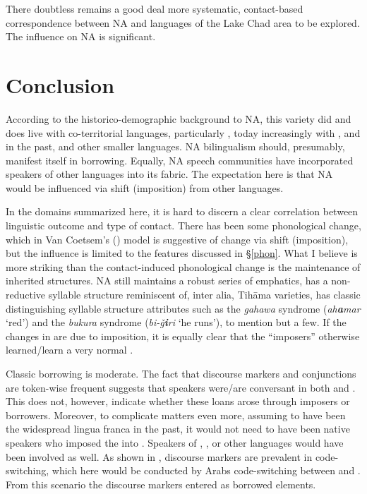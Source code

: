 \documentclass[output=paper]{langsci/langscibook}
\begin{document}
There doubtless remains a good deal more systematic, contact-based correspondence between NA and languages of the {Lake Chad} area to be explored. The influence on NA is significant.

\section{Conclusion
} \label{conc}

According to the historico-demographic background to NA, this variety did and does live with co-territorial languages, particularly , today increasingly with , and in the past,  and other smaller languages. NA {bilingualism} should, presumably, manifest itself in borrowing. Equally, NA speech communities have incorporated speakers of other languages into its fabric. The expectation here is that NA would be influenced via shift ({imposition}) from other languages.

In the domains summarized here, it is hard to discern a clear correlation between linguistic outcome and type of contact. There has been some phonological change, which in Van Coetsem’s (\citeyear{VanCoetsem1988,VanCoetsem2000}) model is suggestive of change via shift ({imposition}), but the influence is limited to the features discussed in §\ref{phon}. What I believe is more striking than the contact-induced phonological change is the maintenance of inherited structures. NA still maintains a robust series of emphatics, has a non-reductive syllable structure reminiscent of, inter alia, Tihāma varieties, has classic distinguishing syllable structure attributes such as the \textit{gahawa} syndrome (\textit{ah}\textbf{\textit{a}}\textit{mar} ‘red’) and the \textit{bukura} syndrome (\textit{bi-ǧ}\textbf{\textit{i}}\textit{ri} ‘he runs’), to mention but a few. If the changes in  are due to {imposition}, it is equally clear that the “imposers” otherwise learned/learn a very normal .


Classic borrowing is moderate. The fact that discourse markers and conjunctions are token-wise frequent suggests that speakers were/are conversant in both  and . This does not, however, indicate whether these loans arose through imposers or borrowers. Moreover, to complicate matters even more, assuming  to have been the widespread lingua franca in the past, it would not need to have been native  speakers who imposed the  into . Speakers of , ,  or other languages would have been involved as well. As shown in \citet{OwensHassan2010}, discourse markers are prevalent in {code-switching}, which here would be conducted by Arabs {code-switching} between  and . From this scenario the discourse markers entered as borrowed elements.
\end{document}
